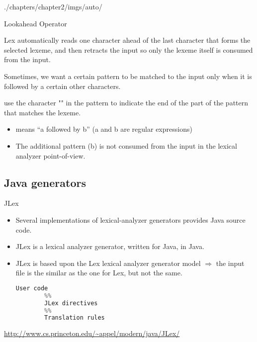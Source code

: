 \begin{graphicspathcontext}{{./chapters/chapter2/imgs/auto/}}
\begin{bibunit}[apalike]
\begin{frame}{Lookahead Operator}
	\begin{description}
	\item Lex automatically reads one character ahead of the last character that forms the selected lexeme, and then retracts the input so only the lexeme itself is consumed from the input.
	\vfill
	\item[Problem] Sometimes, we want a certain pattern to be matched to the input only when it is followed by a certain other characters.
	\vfill
	\item[Solution] use the character "\code{/}" in the pattern to indicate the end of the part of the pattern that matches the lexeme.
		\begin{itemize}
		\item {} means ``a followed by b'' (a and b are regular expressions) 
		\item The additional pattern (b) is not consumed from the input in the lexical analyzer point-of-view.
		\end{itemize}
	\end{description}
\end{frame}

\subsection{Java generators}

\tableofcontentslide[sections={1-5},sectionstyle={show/shaded},subsectionstyle={show/shaded/hide},subsubsectionstyle={hide/hide/hide/hide}]

\begin{frame}[fragile]{JLex}
	\begin{itemize}
	\item Several implementations of lexical-analyzer generators provides Java source code.
	\vfill
	\item JLex is a lexical analyzer generator, written for Java, in Java.
	\item JLex is based upon the Lex lexical analyzer generator model $\Rightarrow$ \alert{the input file is the similar as the one for Lex, but not the same}.
		\begin{lstlisting}[language=C]
		User code
		%%
		JLex directives
		%%
		Translation rules
		\end{lstlisting}
	\end{itemize}
	\vfill
	\begin{center}
	\url{http://www.cs.princeton.edu/~appel/modern/java/JLex/}
	\end{center}
\end{frame}


\end{bibunit}
\end{graphicspathcontext}
